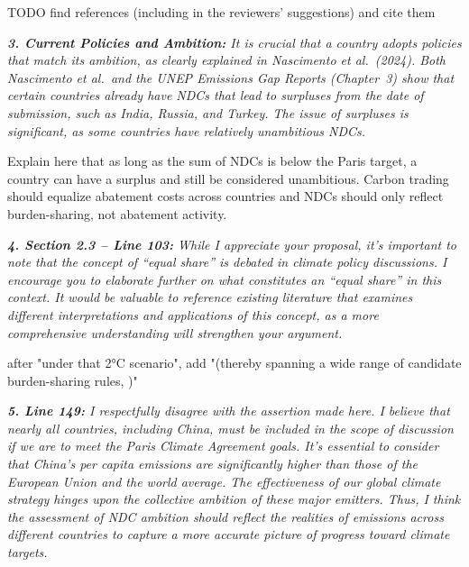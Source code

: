 \documentclass[11pt]{article}
\newenvironment{italic}{\itshape}{\par}
\begin{document}
TODO find references (including in the reviewers' suggestions) and cite them




\begin{italic}
\textbf{3. Current Policies and Ambition:} It is crucial that a country adopts policies that match its ambition, as clearly explained in Nascimento et al.\ (2024). Both Nascimento et al.\ and the UNEP Emissions Gap Reports (Chapter~3) show that certain countries already have NDCs that lead to surpluses from the date of submission, such as India, Russia, and Turkey. The issue of surpluses is significant, as some countries have relatively unambitious NDCs.
\end{italic}


Explain here that as long as the sum of NDCs is below the Paris target, a country can have a surplus and still be considered unambitious. Carbon trading should equalize abatement costs across countries and NDCs should only reflect burden-sharing, not abatement activity.



\begin{italic}
\textbf{4. Section 2.3 -- Line 103:} While I appreciate your proposal, it's important to note that the concept of ``equal share'' is debated in climate policy discussions. I encourage you to elaborate further on what constitutes an ``equal share'' in this context. It would be valuable to reference existing literature that examines different interpretations and applications of this concept, as a more comprehensive understanding will strengthen your argument.
\end{italic}

after "under that 2°C scenario", add "(thereby spanning a wide range of candidate burden-sharing rules, \citealp{van_den_berg_implications_2020})"




\begin{italic}
\textbf{5. Line 149:} I respectfully disagree with the assertion made here. I believe that nearly all countries, including China, must be included in the scope of discussion if we are to meet the Paris Climate Agreement goals. It's essential to consider that China's per capita emissions are significantly higher than those of the European Union and the world average. The effectiveness of our global climate strategy hinges upon the collective ambition of these major emitters. Thus, I think the assessment of NDC ambition should reflect the realities of emissions across different countries to capture a more accurate picture of progress toward climate targets.
\end{italic}
\end{document}
